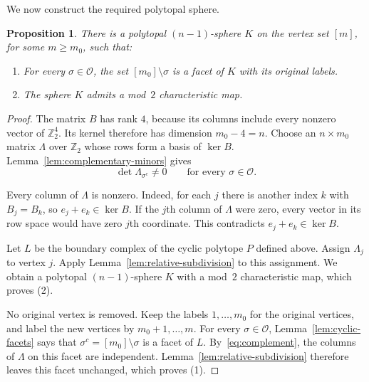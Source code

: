 \documentclass[10pt,a4paper]{amsart}
\theoremstyle{plain}
\newtheorem{proposition}[theorem]{Proposition}
\numberwithin{equation}{section}
\theoremstyle{remark}
\theoremstyle{definition}
\newcommand{\Z}{\mathbb Z}
\newcommand{\cO}{\mathcal O}
\begin{document}
We now construct the required polytopal sphere.
\begin{proposition}\label{prop:polytope}
    There is a polytopal $(n-1)$-sphere $K$ on the vertex set $[m]$, for some $m\ge m_0$, such that:
    \begin{enumerate}
        \item For every $\sigma\in\cO$, the set $[m_0]\setminus\sigma$ is a facet of $K$ with its original labels.
        \item The sphere $K$ admits a mod~$2$ characteristic map.
    \end{enumerate}
\end{proposition}
\begin{proof}
    The matrix $B$ has rank $4$, because its columns include every nonzero vector of $\Z_2^4$.
    Its kernel therefore has dimension $m_0-4=n$.
    Choose an $n\times m_0$ matrix $\Lambda$ over $\Z_2$ whose rows form a basis of $\ker B$.
    Lemma~\ref{lem:complementary-minors} gives 
    \begin{equation}\label{eq:complement}
        \det\Lambda_{\sigma^c}\ne0     \qquad\text{for every }\sigma\in\cO.
    \end{equation}
    
    Every column of $\Lambda$ is nonzero.
    Indeed, for each $j$ there is another index $k$ with $B_j=B_k$, so $e_j+e_k\in\ker B$.
    If the $j$th column of $\Lambda$ were zero, every vector in its row space would have zero $j$th coordinate.
    This contradicts $e_j+e_k\in\ker B$.
    
    Let $L$ be the boundary complex of the cyclic polytope $P$ defined above.
    Assign $\Lambda_j$ to vertex $j$.
    Apply Lemma~\ref{lem:relative-subdivision} to this assignment.
    We obtain a polytopal $(n-1)$-sphere $K$ with a mod~$2$ characteristic map, which proves (2).

    No original vertex is removed.
    Keep the labels $1,\ldots,m_0$ for the original vertices, and label the new vertices by $m_0+1,\ldots,m$.
    For every $\sigma \in \cO$, Lemma~\ref{lem:cyclic-facets} says that $\sigma^c = [m_0] \setminus \sigma$ is a facet of $L$.
    By~\eqref{eq:complement}, the columns of $\Lambda$ on this facet are independent.
    Lemma~\ref{lem:relative-subdivision} therefore leaves this facet unchanged, which proves (1).
\end{proof}
\end{document}
